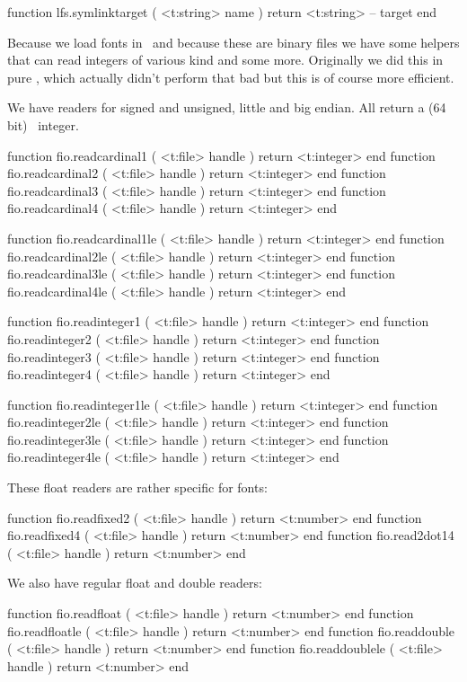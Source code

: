 \starttyping[option=LUA]
function lfs.symlinktarget ( <t:string> name )
    return <t:string> -- target
end
\stoptyping

\stopsubsection

\startsubsection[title=Reading from a file]

Because we load fonts in \LUA\ and because these are binary files we have some
helpers that can read integers of various kind and some more. Originally we did
this in pure \LUA, which actually didn't perform that bad but this is of course
more efficient.

We have readers for signed and unsigned, little and big endian. All return a (64
bit) \LUA\ integer.

\starttyping[option=LUA]
function fio.readcardinal1 ( <t:file> handle ) return <t:integer> end
function fio.readcardinal2 ( <t:file> handle ) return <t:integer> end
function fio.readcardinal3 ( <t:file> handle ) return <t:integer> end
function fio.readcardinal4 ( <t:file> handle ) return <t:integer> end

function fio.readcardinal1le ( <t:file> handle ) return <t:integer> end
function fio.readcardinal2le ( <t:file> handle ) return <t:integer> end
function fio.readcardinal3le ( <t:file> handle ) return <t:integer> end
function fio.readcardinal4le ( <t:file> handle ) return <t:integer> end

function fio.readinteger1 ( <t:file> handle ) return <t:integer> end
function fio.readinteger2 ( <t:file> handle ) return <t:integer> end
function fio.readinteger3 ( <t:file> handle ) return <t:integer> end
function fio.readinteger4 ( <t:file> handle ) return <t:integer> end

function fio.readinteger1le ( <t:file> handle ) return <t:integer> end
function fio.readinteger2le ( <t:file> handle ) return <t:integer> end
function fio.readinteger3le ( <t:file> handle ) return <t:integer> end
function fio.readinteger4le ( <t:file> handle ) return <t:integer> end
\stoptyping

These float readers are rather specific for fonts:

\starttyping[option=LUA]
function fio.readfixed2 ( <t:file> handle ) return <t:number>  end
function fio.readfixed4 ( <t:file> handle ) return <t:number>  end
function fio.read2dot14 ( <t:file> handle ) return <t:number>  end
\stoptyping

We also have regular float and double readers:

\starttyping[option=LUA]
function fio.readfloat    ( <t:file> handle ) return <t:number>  end
function fio.readfloatle  ( <t:file> handle ) return <t:number>  end
function fio.readdouble   ( <t:file> handle ) return <t:number>  end
function fio.readdoublele ( <t:file> handle ) return <t:number>  end
\stoptyping

